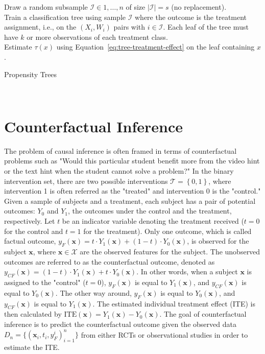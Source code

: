 \documentclass{article}
\begin{document}
\LinesNumberedHidden
\begin{algorithm}[h]
  \ShowLn Draw a random subsample $\mathcal{I} \in {1, \ldots, n}$ of
  size $|\mathcal{I}| = s$ (no replacement). \\
  \ShowLn Train a classification tree using sample $\mathcal{I}$ where
  the outcome is the treatment assignment, i.e., on the $(X_i, W_i)$
  pairs with $i \in \mathcal{I}$. Each leaf of the tree must have $k$
  or more observations of each treatment class. \\
  \ShowLn Estimate $\tau(x)$ using
  Equation~\ref{eq:tree-treatment-effect} on the leaf containing $x$.
  \caption{Propensity Trees}~\label{algo:propensity-trees}
\end{algorithm}

\section{Counterfactual Inference}
The problem of causal inference is often framed in terms of
counterfactual problems such as "Would this particular student benefit
more from the video hint or the text hint when the student cannot
solve a problem?" In the binary intervention set, there are two possible interventions
$\mathcal{T} = \left \{  0, 1 \right \}$, where intervention 1 is
often referred as the "treated" and intervention 0 is the "control."
Given a sample of subjects and a treatment, each subject has a pair of
potential outcomes: $Y_0$ and $Y_1$, the outcomes under the
control and the treatment, respectively. Let $t$ be an indicator
variable denoting the treatment received ($t = 0$ for the control and
$t=1$ for the treatment). Only one outcome, which is called factual
outcome, $y_F(\mathbf{x}) =t\cdot Y_1(\mathbf{x}) +
(1-t) \cdot Y_0(\mathbf{x})$, is observed for the
subject $\mathbf{x}$, where
$\mathbf{x} \in \mathcal{X}$ are the
observed features for the subject. The unobserved outcomes are referred to as the
counterfactual outcome, denoted as $y_{CF}(\mathbf{x}) = (1-t)\cdot Y_1(\mathbf{x}) +
t \cdot Y_0(\mathbf{x})$. In other words, when a subject $\mathbf{x}$ is assigned to the
"control" ($t = 0$), $y_F(\mathbf{x})$ is equal to $Y_1(\mathbf{x})$, and $y_{CF}(\mathbf{x})$ is
equal to $Y_0(\mathbf{x})$. The other way around, $y_F(\mathbf{x})$ is equal to
$Y_0(\mathbf{x})$, and $y_{CF}(\mathbf{x})$ is equal to $Y_1(\mathbf{x})$. The estimated
individual treatment effect (ITE) is then calculated by
$\mathrm{ITE}(\mathbf{x})=Y_1(\mathbf{x}) - Y_0(\mathbf{x})$. The goal
of counterfactual inference is to predict the counterfactual outcome
given the observed data $D_n=\{(\mathbf{x}_i,t_i,y_F^i)_{i=1}^n\}$ from either RCTs or observational studies in
order to estimate the ITE.
\end{document}
